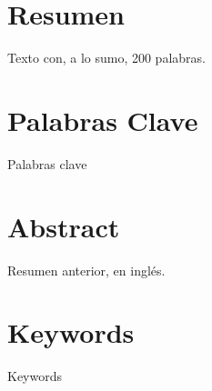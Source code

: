 \vspace*{-2.5cm}
\section*{Resumen}
\label{sec:resumen}

Texto con, a lo sumo, 200 palabras.




\vfill
\vfill
\section*{Palabras Clave}
\label{sec:palabra_clave}

Palabras clave
\vfill
\vfill


\clearpage

\vspace*{-2.5cm}
\section*{Abstract}
\label{sec:abstract}
Resumen anterior, en inglés.




\vfill
\vfill
\section*{Keywords}
\label{sec:keywords}
Keywords
\vfill
\vfill